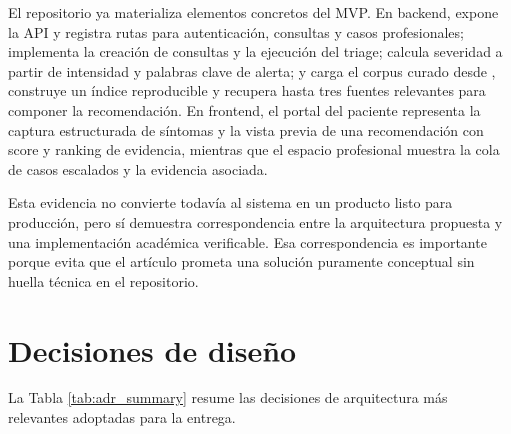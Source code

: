 \documentclass[12pt]{article}
\begin{document}
El repositorio ya materializa elementos concretos del MVP. En backend,  expone la API y registra rutas para autenticación, consultas y casos profesionales;  implementa la creación de consultas y la ejecución del triage;  calcula severidad a partir de intensidad y palabras clave de alerta; y  carga el corpus curado desde , construye un índice reproducible y recupera hasta tres fuentes relevantes para componer la recomendación. En frontend, el portal del paciente representa la captura estructurada de síntomas y la vista previa de una recomendación con score y ranking de evidencia, mientras que el espacio profesional muestra la cola de casos escalados y la evidencia asociada.

Esta evidencia no convierte todavía al sistema en un producto listo para producción, pero sí demuestra correspondencia entre la arquitectura propuesta y una implementación académica verificable. Esa correspondencia es importante porque evita que el artículo prometa una solución puramente conceptual sin huella técnica en el repositorio.

\section{Decisiones de diseño}

La Tabla \ref{tab:adr_summary} resume las decisiones de arquitectura más relevantes adoptadas para la entrega.
\end{document}

